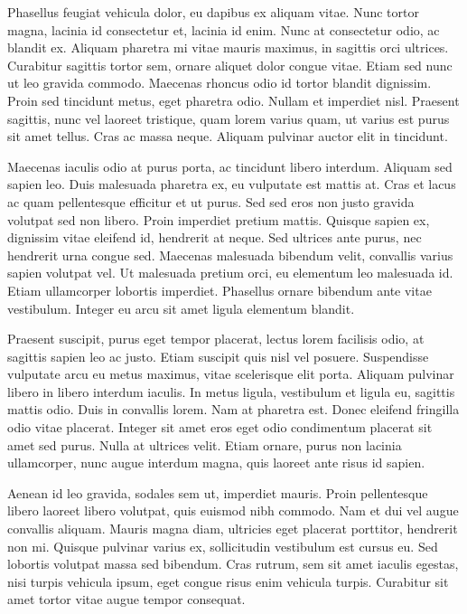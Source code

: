 \documentclass{modelica}
\begin{document}
Phasellus feugiat vehicula dolor, eu dapibus ex aliquam vitae. Nunc tortor magna, lacinia id consectetur et, lacinia id enim. Nunc at consectetur odio, ac blandit ex. Aliquam pharetra mi vitae mauris maximus, in sagittis orci ultrices. Curabitur sagittis tortor sem, ornare aliquet dolor congue vitae. Etiam sed nunc ut leo gravida commodo. Maecenas rhoncus odio id tortor blandit dignissim. Proin sed tincidunt metus, eget pharetra odio. Nullam et imperdiet nisl. Praesent sagittis, nunc vel laoreet tristique, quam lorem varius quam, ut varius est purus sit amet tellus. Cras ac massa neque. Aliquam pulvinar auctor elit in tincidunt.

Maecenas iaculis odio at purus porta, ac tincidunt libero interdum. Aliquam sed sapien leo. Duis malesuada pharetra ex, eu vulputate est mattis at. Cras et lacus ac quam pellentesque efficitur et ut purus. Sed sed eros non justo gravida volutpat sed non libero. Proin imperdiet pretium mattis. Quisque sapien ex, dignissim vitae eleifend id, hendrerit at neque. Sed ultrices ante purus, nec hendrerit urna congue sed. Maecenas malesuada bibendum velit, convallis varius sapien volutpat vel. Ut malesuada pretium orci, eu elementum leo malesuada id. Etiam ullamcorper lobortis imperdiet. Phasellus ornare bibendum ante vitae vestibulum. Integer eu arcu sit amet ligula elementum blandit.

Praesent suscipit, purus eget tempor placerat, lectus lorem facilisis odio, at sagittis sapien leo ac justo. Etiam suscipit quis nisl vel posuere. Suspendisse vulputate arcu eu metus maximus, vitae scelerisque elit porta. Aliquam pulvinar libero in libero interdum iaculis. In metus ligula, vestibulum et ligula eu, sagittis mattis odio. Duis in convallis lorem. Nam at pharetra est. Donec eleifend fringilla odio vitae placerat. Integer sit amet eros eget odio condimentum placerat sit amet sed purus. Nulla at ultrices velit. Etiam ornare, purus non lacinia ullamcorper, nunc augue interdum magna, quis laoreet ante risus id sapien.

Aenean id leo gravida, sodales sem ut, imperdiet mauris. Proin pellentesque libero laoreet libero volutpat, quis euismod nibh commodo. Nam et dui vel augue convallis aliquam. Mauris magna diam, ultricies eget placerat porttitor, hendrerit non mi. Quisque pulvinar varius ex, sollicitudin vestibulum est cursus eu. Sed lobortis volutpat massa sed bibendum. Cras rutrum, sem sit amet iaculis egestas, nisi turpis vehicula ipsum, eget congue risus enim vehicula turpis. Curabitur sit amet tortor vitae augue tempor consequat.
\end{document}
